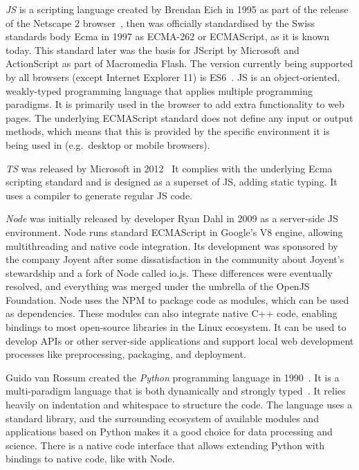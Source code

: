 

\emph{\ac{JS}} is a scripting language created by Brendan Eich in 1995 as part of the release of the Netscape 2 browser~\parencite{javascriptRelease}, then was officially standardised by the Swiss standards body Ecma in 1997 as ECMA-262 or ECMAScript, as it is known today.
This standard later was the basis for JScript by Microsoft and ActionScript as part of Macromedia Flash.
The version currently being supported by all browsers (except Internet Explorer 11) is \ac{ES6}~\parencite{javascriptHistory}. \ac{JS} is an object-oriented, weakly-typed programming language that applies multiple programming paradigms.
It is primarily used in the browser to add extra functionality to web pages.
The underlying ECMAScript standard does not define any input or output methods, which means that this is provided by the specific environment it is being used in (e.g.\ desktop or mobile browsers).

\emph{\ac{TS}} was released by Microsoft in 2012~ It complies with the underlying Ecma scripting standard and is designed as a superset of \ac{JS}, adding static typing.
It uses a compiler to generate regular \ac{JS} code.

\emph{Node} was initially released by developer Ryan Dahl in 2009 as a server-side \ac{JS} environment.
Node runs standard ECMAScript in Google's V8 engine, allowing multithreading and native code integration.
Its development was sponsored by the company Joyent after some dissatisfaction in the community about Joyent's stewardship and a fork of Node called io.js.
These differences were eventually resolved, and everything was merged under the umbrella of the OpenJS Foundation.
Node uses the \ac{NPM} to package code as modules, which can be used as dependencies.
These modules can also integrate native C++ code, enabling bindings to most open-source libraries in the Linux ecosystem.
It can be used to develop \ac{API}s or other server-side applications and support local web development processes like preprocessing, packaging, and deployment.

Guido van Rossum created the \emph{Python} programming language in 1990~\parencite{pythonHistory}.
It is a multi-paradigm language that is both dynamically and strongly typed~\parencite{pythonTyping}.
It relies heavily on indentation and whitespace to structure the code.
The language uses a standard library, and the surrounding ecosystem of available modules and applications based on Python makes it a good choice for data processing and science.
There is a native code interface that allows extending Python with bindings to native code, like with Node.

